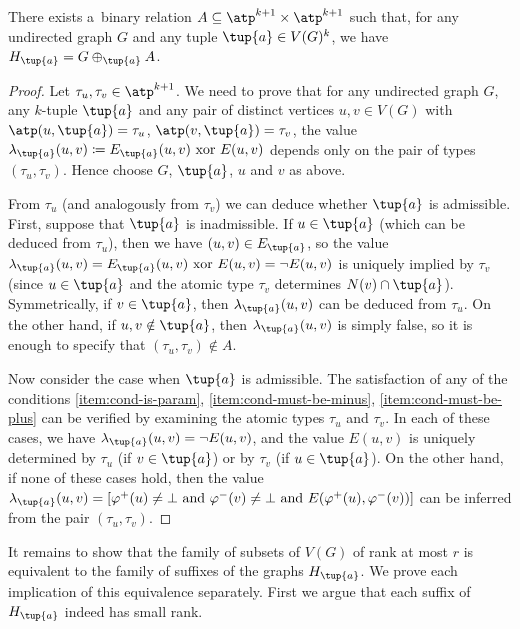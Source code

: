 \begin{lemma}
    \label{lem:low-rank-to-suffixes-exists-relation}
    There exists a~binary relation $A \subseteq \atp^{k+1} \times \atp^{k+1}$ such that, for any undirected graph $G$ and any tuple $\tup{a} \in V(G)^k$, we have $H_{\tup{a}} = G \oplus_{\tup{a}} A$.
\end{lemma}
\begin{proof}
    Let $\tau_u, \tau_v \in \atp^{k+1}$.
    We need to prove that for any undirected graph $G$, any $k$-tuple $\tup{a}$ and any pair of distinct vertices $u, v \in V(G)$ with $\atp(u, \tup{a}) = \tau_u$, $\atp(v, \tup{a}) = \tau_v$, the value $\lambda_{\tup{a}}(u, v) \coloneqq E_{\tup{a}}(u, v)\ \textrm{xor}\ E(u, v)$ depends only on the pair of types $(\tau_u, \tau_v)$.
    Hence choose $G$, $\tup{a}$, $u$ and $v$ as above.

    From $\tau_u$ (and analogously from $\tau_v$) we can deduce whether $\tup{a}$ is admissible.
    First, suppose that $\tup{a}$ is inadmissible.
    If $u \in \tup{a}$ (which can be deduced from $\tau_u$), then we have $(u, v) \in E_{\tup{a}}$, so the value $\lambda_{\tup{a}}(u, v) = E_{\tup{a}}(u, v) \ \textrm{xor}\ E(u, v) = \neg E(u, v)$ is uniquely implied by $\tau_v$ (since $u \in \tup{a}$ and the atomic type $\tau_v$ determines $N(v) \cap \tup{a}$).
    Symmetrically, if $v \in \tup{a}$, then $\lambda_{\tup{a}}(u, v)$ can be deduced from $\tau_u$.
    On the other hand, if $u, v \notin \tup{a}$, then $\lambda_{\tup{a}}(u, v)$ is simply false, so it is enough to specify that $(\tau_u, \tau_v) \notin A$.

    Now consider the case when $\tup{a}$ is admissible.
    The satisfaction of any of the conditions \ref{item:cond-is-param}, \ref{item:cond-must-be-minus}, \ref{item:cond-must-be-plus} can be verified by examining the atomic types $\tau_u$ and $\tau_v$.
    In each of these cases, we have $\lambda_{\tup{a}}(u, v) = \neg E(u, v)$, and the value $E(u, v)$ is uniquely determined by $\tau_u$ (if $v \in \tup{a}$) or by $\tau_v$ (if $u \in \tup{a}$).
    On the other hand, if none of these cases hold, then the value $\lambda_{\tup{a}}(u, v) = [\varphi^+(u) \neq \bot\ \textrm{and}\ \varphi^-(v) \neq \bot\ \textrm{and}\ E(\varphi^+(u), \varphi^-(v))]$ can be inferred from the pair $(\tau_u, \tau_v)$.
\end{proof}

It remains to show that the family of subsets of $V(G)$ of rank at most $r$ is equivalent to the family of suffixes of the graphs $H_{\tup{a}}$.
We prove each implication of this equivalence separately. First we  argue that each suffix of $H_{\tup{a}}$ indeed has small rank.

